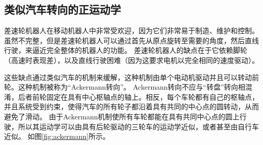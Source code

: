 \subsection{类似汽车转向的正运动学}

差速轮机器人在移动机器人中非常受欢迎，因为它们非常易于制造、维护和控制。 虽然不完整，但是差速轮机器人可以通过首先从原点旋转至需要的角度，然后直线行驶，来逼近完全整体的机器人的功能。 差速轮机器人的缺点在于它依赖脚轮（高速时表现差），以及直线行驶困难（因为这要求电机以完全相同的速度驱动）。


这些缺点通过类似汽车的机制来缓解，这种机制由单个电动机驱动并且可以转动前轮。这种机制被称为“Ackermann转向”。 Ackermann转向不应与“转盘”转向相混淆，后者前轮固定在具有中心枢轴点的轴上。相反，每个车轮都有自己的枢轴点，并且系统受到约束，使得汽车的所有轮子都沿着具有共同的中心点的圆转动，从而避免了滑动。 由于Ackermann机制使所有车轮都能在具有共同中心点的圆上行驶，所以其运动学可以由具有后轮驱动的三轮车的运动学近似，或者甚至由自行车近似。 如图\ref{fig:ackermann}所示。

